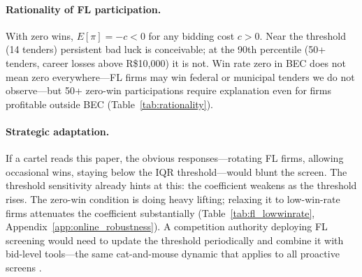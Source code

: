\paragraph{Rationality of FL participation.}
\label{sec:rationality}
With zero wins, $E[\pi] = -c < 0$ for any bidding cost $c > 0$. Near
the threshold (14 tenders) persistent bad luck is conceivable; at the
90th percentile (50+ tenders, career losses above R\$10{,}000) it is
not. Win rate zero in BEC does not mean zero everywhere---FL firms may
win federal or municipal tenders we do not observe---but 50+ zero-win
participations require explanation even for firms profitable outside
BEC \citep{asker2010leniency, marshall2012economics}
(Table~\ref{tab:rationality}).



\paragraph{Strategic adaptation.}
If a cartel reads this paper, the obvious responses---rotating FL
firms, allowing occasional wins, staying below the IQR threshold---would blunt the screen. The threshold sensitivity already hints at
this: the coefficient weakens as the threshold rises. The zero-win
condition is doing heavy lifting; relaxing it to low-win-rate firms
attenuates the coefficient substantially
(Table~\ref{tab:fl_lowwinrate},
Appendix~\ref{app:online_robustness}). A competition authority
deploying FL screening would need to update the threshold periodically
and combine it with bid-level tools---the same cat-and-mouse dynamic
that applies to all proactive screens
\citep{harrington2008detecting}.



